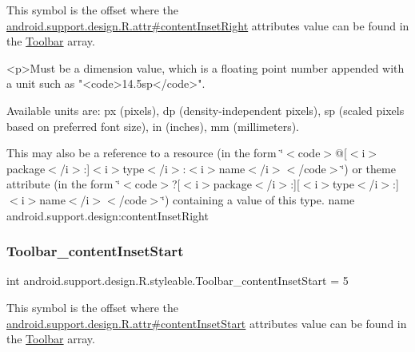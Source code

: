 This symbol is the offset where the \hyperlink{classandroid_1_1support_1_1design_1_1R_1_1attr_a6491aa248894c7643f5e77a4a345066c}{android.\+support.\+design.\+R.\+attr\#content\+Inset\+Right} attribute\textquotesingle{}s value can be found in the \hyperlink{classandroid_1_1support_1_1design_1_1R_1_1styleable_a7783ebe780dbe2a845802a40519a46e9}{Toolbar} array.

\begin{DoxyVerb}      <p>Must be a dimension value, which is a floating point number appended with a unit such as "<code>14.5sp</code>".
\end{DoxyVerb}
 Available units are\+: px (pixels), dp (density-\/independent pixels), sp (scaled pixels based on preferred font size), in (inches), mm (millimeters). 

This may also be a reference to a resource (in the form \char`\"{}$<$code$>$@\mbox{[}$<$i$>$package$<$/i$>$\+:\mbox{]}$<$i$>$type$<$/i$>$\+:$<$i$>$name$<$/i$>$$<$/code$>$\char`\"{}) or theme attribute (in the form \char`\"{}$<$code$>$?\mbox{[}$<$i$>$package$<$/i$>$\+:\mbox{]}\mbox{[}$<$i$>$type$<$/i$>$\+:\mbox{]}$<$i$>$name$<$/i$>$$<$/code$>$\char`\"{}) containing a value of this type.  name android.\+support.\+design\+:content\+Inset\+Right \mbox{\label{classandroid_1_1support_1_1design_1_1R_1_1styleable_a6205b5236737b47332a0c7ab6459eb3d}} 
\subsubsection{\texorpdfstring{Toolbar\+\_\+content\+Inset\+Start}{Toolbar\_contentInsetStart}}
{\footnotesize\ttfamily int android.\+support.\+design.\+R.\+styleable.\+Toolbar\+\_\+content\+Inset\+Start = 5\hspace{0.3cm}{\ttfamily [static]}}

This symbol is the offset where the \hyperlink{classandroid_1_1support_1_1design_1_1R_1_1attr_ad3756cf8d5e48c3ed37e110730040fc9}{android.\+support.\+design.\+R.\+attr\#content\+Inset\+Start} attribute\textquotesingle{}s value can be found in the \hyperlink{classandroid_1_1support_1_1design_1_1R_1_1styleable_a7783ebe780dbe2a845802a40519a46e9}{Toolbar} array.

